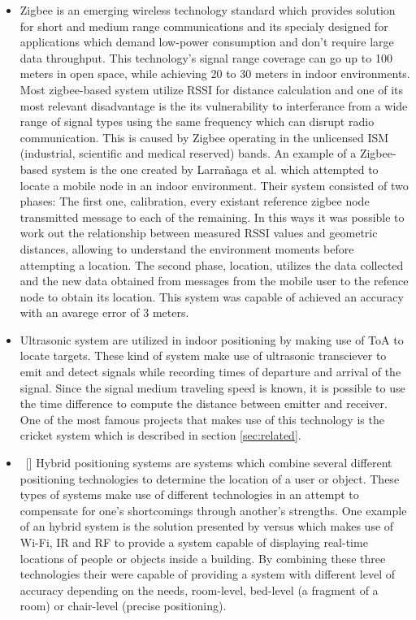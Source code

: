 \begin{itemize}
\item [] Zigbee is an emerging wireless technology standard which provides solution for short and medium range communications and its specialy designed for applications which demand low-power consumption and don't require large data throughput. This technology's signal range coverage can go up to 100 meters in open space, while achieving 20 to 30 meters in indoor environments. Most zigbee-based system utilize \ac{RSSI} for distance calculation and one of its most relevant disadvantage is the its vulnerability to interferance from a wide range of signal types using the same frequency which can disrupt radio communication. This is caused by Zigbee operating in the unlicensed ISM (industrial, scientific and medical reserved) bands. An example of a Zigbee-based system is the one created by Larrañaga et al. \cite{zigbee} which attempted to locate a mobile node in an indoor environment. Their system consisted of two phases: The first one, calibration, every existant reference zigbee node transmitted message to each of the remaining. In this ways it was possible to work out the relationship between measured \ac{RSSI} values and geometric distances, allowing to understand the environment moments before attempting a location. The second phase, location, utilizes the data collected and the new data obtained from messages from the mobile user to the refence node to obtain its location. This system was capable of achieved an accuracy with an avarege error of 3 meters.  


\item [] Ultrasonic system are utilized in indoor positioning by making use of \ac{ToA} to locate targets. These kind of system make use of ultrasonic transciever to emit and detect signals while recording times of departure and arrival of the signal. Since the signal medium traveling speed is known, it is possible to use the time difference to compute the distance between emitter and receiver.  One of the most famous projects that makes use of this technology is the cricket system which is described in section \ref{sec:related}.


\item [] Hybrid positioning systems are systems which combine several different positioning technologies to determine the location of a user or object. These types of systems make use of different technologies in an attempt to compensate for one's shortcomings through another's strengths. One example of an hybrid system is the solution presented by versus \cite{versus} which makes use of Wi-Fi, IR and RF to provide a system capable of displaying real-time locations of people or objects inside a building. By combining these three technologies their were capable of providing a system with different level of accuracy depending on the needs, room-level, bed-level (a fragment of a room) or chair-level (precise positioning). 

\end{itemize}
